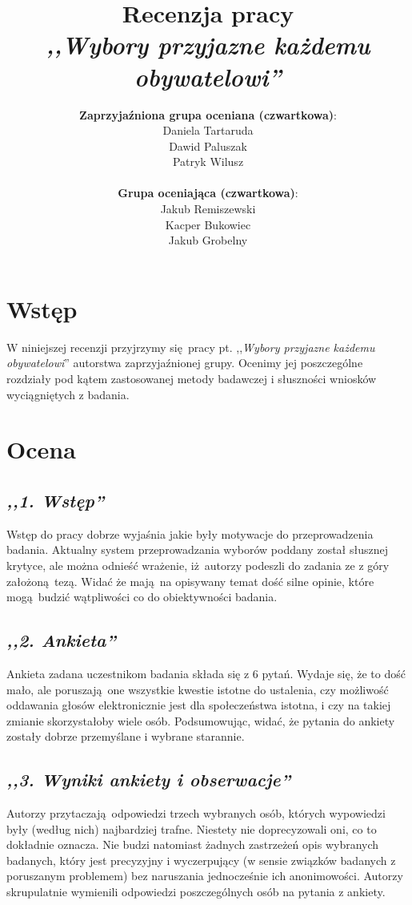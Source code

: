 \documentclass[12pt, a4paper, oneside]{article}
\title{Recenzja pracy\\ \textit{,,Wybory przyjazne każdemu obywatelowi''}}
\date{}
\author{
    \textbf{Zaprzyjaźniona grupa oceniana \small(czwartkowa)}:
        \\ Daniela Tartaruda
        \\ Dawid Paluszak
        \\ Patryk Wilusz\\
    \\\textbf{Grupa oceniająca \small(czwartkowa)}:
        \\ Jakub Remiszewski
        \\ Kacper Bukowiec
        \\ Jakub Grobelny
}
\begin{document}
\begin{titlepage}
    \maketitle
\end{titlepage}

\section*{Wstęp}

W niniejszej recenzji przyjrzymy się pracy pt. ,,\textit{Wybory przyjazne 
każdemu obywatelowi}'' autorstwa zaprzyjaźnionej grupy. Ocenimy jej 
poszczególne rozdziały pod kątem zastosowanej metody badawczej i słuszności 
wniosków wyciągniętych z badania. 

\section*{Ocena}

\subsection*{\textit{,,1. Wstęp''}}

Wstęp do pracy dobrze wyjaśnia jakie były motywacje do przeprowadzenia badania. 
Aktualny system przeprowadzania wyborów poddany został słusznej krytyce, ale 
można odnieść wrażenie, iż autorzy podeszli do zadania ze z góry założoną tezą. 
Widać że mają na opisywany temat dość silne opinie, które mogą budzić 
wątpliwości co do obiektywności badania.

\subsection*{\textit{,,2. Ankieta''}}

Ankieta zadana uczestnikom badania składa się z 6 pytań. Wydaje się, że to dość 
mało, ale poruszają one wszystkie kwestie istotne do ustalenia, czy możliwość 
oddawania głosów elektronicznie jest dla społeczeństwa istotna, i czy na takiej 
zmianie skorzystałoby wiele osób. Podsumowując, widać, że pytania do ankiety zostały dobrze przemyślane i wybrane starannie.

\subsection*{\textit{,,3. Wyniki ankiety i obserwacje''}}

Autorzy przytaczają odpowiedzi trzech wybranych osób, których wypowiedzi były 
(według nich) najbardziej trafne. Niestety nie doprecyzowali oni, co to 
dokładnie oznacza. Nie budzi natomiast żadnych zastrzeżeń opis wybranych 
badanych, który jest precyzyjny i wyczerpujący (w sensie związków badanych z poruszanym problemem) bez naruszania jednocześnie ich anonimowości. 
Autorzy skrupulatnie wymienili odpowiedzi poszczególnych osób na pytania z 
ankiety.
\end{document}
